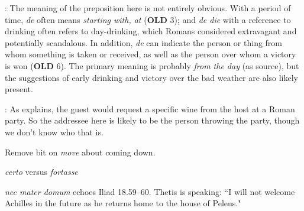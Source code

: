 : The meaning of the preposition here is not entirely obvious.  With a period of time, \textit{de} often means \textit{starting with, at} (\textbf{OLD} 3); and \textit{de die} with a reference to drinking often refers to day-drinking, which Romans considered extravagant and potentially scandalous.  In addition, \textit{de} can indicate the person or thing from whom something is taken or received, as well as the person over whom a victory is won (\textbf{OLD} 6).  The primary meaning is probably \textit{from the day} (as source), but the suggestions of early drinking and victory over the bad weather are also likely present.

: As \citet[136]{kilpatrick1970} explains, the guest would request a specific wine from the host at a Roman party.  So the addressee here is likely to be the person throwing the party, though we don't know who that is.

Remove bit on \textit{move} about coming down.

\textit{certo} versus \textit{fortasse}

\textit{nec mater domum} echoes Iliad 18.59--60. Thetis is speaking: ``I will not welcome Achilles in the future as he returns home to the house of Peleus." 
